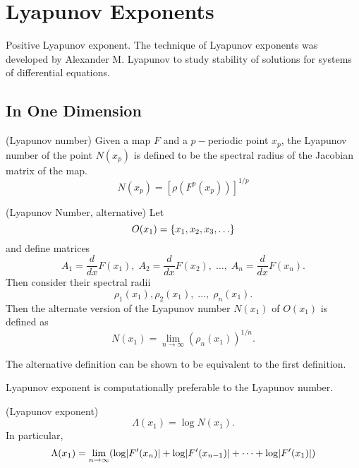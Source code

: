 \documentclass[11pt]{article}
\begin{document}
\section{Lyapunov Exponents}
Positive Lyapunov exponent.\citet{kantz-schreiber} 
The technique of Lyapunov exponents was developed by Alexander M. Lyapunov to study stability of solutions for systems of differential equations.

\subsection{In One Dimension}
\begin{definition}
  (Lyapunov number)
  Given a map $F$ and a $p-$periodic point $x_p$, the Lyapunov number of the point $N(x_p)$ is
  defined to be the spectral radius of the Jacobian matrix of the map.
  \begin{equation*}
    N(x_p) = \left[ \rho\left( F^p(x_p) \right) \right]^{1/p}
  \end{equation*}
  \label{def:lyapnum}
\end{definition}

\begin{definition}
  (Lyapunov Number, alternative)
  Let
  \begin{equation*}
    O(x_1) = \{x_1, x_2, x_3, \ldots\}
  \end{equation*}
  and define matrices
  \begin{equation*}
    A_1 = \frac{d}{dx}F(x_1),\; A_2 = \frac{d}{dx}F(x_2),\; \ldots,\; A_n = \frac{d}{dx}F(x_n).
  \end{equation*}
  Then consider their spectral radii
  \begin{equation*}
    \rho_1(x_1), \rho_2(x_1),\; \ldots,\; \rho_n(x_1).
  \end{equation*}
  Then the alternate version of the Lyapunov number $N(x_1)$ of $O(x_1)$ is defined as 
  \begin{equation*}
    N(x_1) = \lim\limits_{n \to \infty} (\rho_n(x_1))^{1/n}.
  \end{equation*}
\end{definition}
The alternative definition can be shown to be equivalent to the first definition.

Lyapunov exponent is computationally preferable to the Lyapunov number.
\begin{definition}
  (Lyapunov exponent)
  \begin{equation*}
    \Lambda(x_1) = \log N(x_1).
  \end{equation*}
  In particular,
  \begin{equation*}
    \Lambda(x_1) = \lim\limits_{n \to \infty} \paren*{\log\abs{F'(x_n)} + \log\abs{F'(x_{n-1})} + \cdots + \log\abs{F'(x_1)}}
  \end{equation*}
\end{definition}
\end{document}
